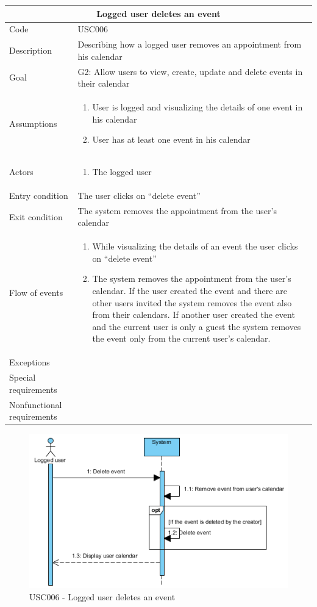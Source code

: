 \documentclass[10pt,a4paper,titlepage]{article}
\begin{document}
\begin{tabular}[h]{| p{3cm} | p{10cm} |}
\hline \multicolumn{2}{|c|}{\textbf{Logged user deletes an event}} \\ 
\hline Code & USC006 \\ 
\hline Description & Describing how a logged user removes an appointment from his calendar \\
\hline Goal & G2: Allow users to view, create, update and delete events in their calendar\\
\hline Assumptions  & \begin{enumerate}
\item User is logged and visualizing the details of one event in his calendar
\item User has at least one event in his calendar
\end{enumerate} \\
\hline Actors &  \begin{enumerate}
\item The logged user
\end{enumerate} \\
\hline Entry condition & The user clicks on “delete event” \\
\hline Exit condition & The system removes the appointment from the user’s calendar \\
\hline Flow of events & \begin{enumerate}
\item While visualizing the details of an event the user clicks on “delete event”
\item The system removes the appointment from the user’s calendar. If the user created the event and there are other users invited the system removes the event also from their calendars. If another user created the event and the current user is only a guest the system removes the event only from the current user’s calendar.
\end{enumerate}\\
\hline Exceptions & \\
\hline Special requirements & \\
\hline Nonfunctional requirements & \\
\hline
\end{tabular}
\begin{figure}[h]
\centering
\includegraphics[width=\linewidth]{./Sequence_diag/USC006.png}
\caption[USC006]{USC006 - Logged user deletes an event}
\label{fig:USC006}
\end{figure}
\end{document}
